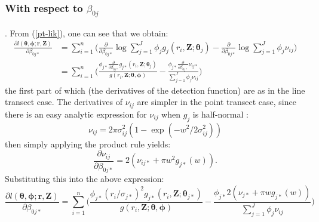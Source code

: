 \documentclass[useAMS,referee]{biom}
\begin{document}
\subsubsection*{With respect to $\beta_{0j}$}. From (\ref{pt-lik}), one can see that we obtain:
\begin{align*}
\frac{\partial l(\bm{\theta}, \bm{\phi}; \mathbf{r},\mathbf{Z})}{\partial \beta_{0j*}}  &= \sum_{i=1}^n \Big( \frac{\partial}{\partial \beta_{0j*}} \log \sum_{j=1}^J \phi_j g_j(r_i,\mathbf{Z}; \bm{\theta}_j) - \frac{\partial}{\partial \beta_{0j*}}\log \sum_{j=1}^J \phi_j \nu_{ij}\Big)\\
&= \sum_{i=1}^n \Big( \frac{ \phi_{j*} \frac{\partial}{\partial \beta_{0j*}}  g_{j*} (r_i,\mathbf{Z}; \bm{\theta}_j)}{g(r_i,\mathbf{Z}; \bm{\theta}, \bm{\phi})} - \frac{ \phi_{j*}\frac{\partial}{\partial \beta_{0j*}}  \nu_{ij*} }{ \sum_{j=1}^J \phi_j \nu_{ij}}\Big)
\end{align*}
the first part of which (the derivatives of the detection function) are as in the line transect case. The derivatives of $\nu_{ij}$ are simpler in the point transect case, since there is an easy analytic expression for $\nu_{ij}$ when $g_j$ is half-normal :
\begin{equation*}
\nu_{ij} = 2 \pi \sigma_{ij}^2 (1-\exp (-w^2/2\sigma_{ij}^2 ))
\end{equation*}
then simply applying the product rule yields:
\begin{equation*}
\frac{\partial \nu_{ij}}{\partial \beta_{0j*}} = 2 (\nu_{ij*} + \pi w^2 g_{j*}(w)).
\end{equation*}
Substituting this into the above expression:
\begin{equation*}
\frac{\partial l(\bm{\theta}, \bm{\phi}; \mathbf{r},\mathbf{Z})}{\partial \beta_{0j*}}  = \sum_{i=1}^n \Big( \frac{ \phi_{j*} (r_i/\sigma_{j*})^2 g_{j*}(r_i,\mathbf{Z}; \bm{\theta}_{j*})}{g(r_i,\mathbf{Z}; \bm{\theta}, \bm{\phi})} - \frac{ \phi_{j*} 2 (\nu_{j*} + \pi w g_{j*}(w)) }{ \sum_{j=1}^J \phi_j \nu_{ij}}\Big)
\end{equation*}
\end{document}
